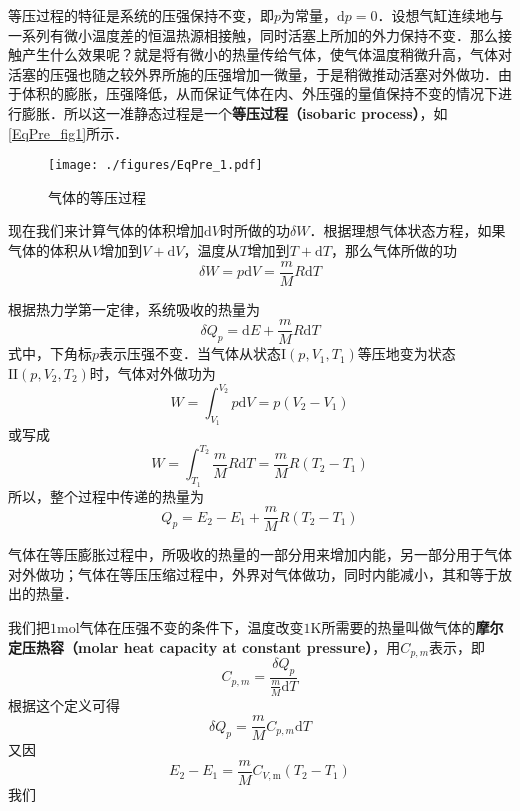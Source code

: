 

等压过程的特征是系统的压强保持不变，即$p $为常量，$\mathrm dp =0$．设想气缸连续地与一系列有微小温度差的恒温热源相接触，同时活塞上所加的外力保持不变．那么接触产生什么效果呢？就是将有微小的热量传给气体，使气体温度稍微升高，气体对活塞的压强也随之较外界所施的压强增加一微量，于是稍微推动活塞对外做功．由于体积的膨胀，压强降低，从而保证气体在内、外压强的量值保持不变的情况下进行膨胀．所以这一准静态过程是一个\textbf{等压过程（isobaric process）}，如\autoref{EqPre_fig1}所示．
\begin{figure}[ht]
\centering
\texttt{[image: ./figures/EqPre\_1.pdf]}
\caption{气体的等压过程} \label{EqPre_fig1}
\end{figure}
现在我们来计算气体的体积增加$\mathrm d V $时所做的功$\delta W$．根据理想气体状态方程，如果气体的体积从$V $增加到$V+\mathrm dV$，温度从$T $增加到$T+\mathrm dT$，那么气体所做的功
\begin{equation}
\delta W=p \mathrm{d} V=\frac{m}{M} R \mathrm{d} T
\end{equation}

根据热力学第一定律，系统吸收的热量为
\begin{equation}
\delta Q_{p}=\mathrm{d} E+\frac{m}{M} R \mathrm{d} T
\end{equation}
式中，下角标$p $表示压强不变．当气体从状态$\mathrm I(p, V_1, T_1)$等压地变为状态$\mathrm{II}(p, V_2,T_2)$时，气体对外做功为
\begin{equation}
W=\int_{V_{1}}^{V_{2}} p \mathrm{d} V=p\left(V_{2}-V_{1}\right)
\end{equation}
或写成
\begin{equation}
W=\int_{T_{1}}^{T_{2}} \frac{m}{M} R \mathrm{d} T=\frac{m}{M} R\left(T_{2}-T_{1}\right)
\end{equation}
所以，整个过程中传递的热量为
\begin{equation}
Q_{p}=E_{2}-E_{1}+\frac{m}{M} R\left(T_{2}-T_{1}\right)
\end{equation}

气体在等压膨胀过程中，所吸收的热量的一部分用来增加内能，另一部分用于气体对外做功；气体在等压压缩过程中，外界对气体做功，同时内能减小，其和等于放出的热量．

我们把$1\mathrm{mol}$气体在压强不变的条件下，温度改变$1\mathrm K$所需要的热量叫做气体的\textbf{摩尔定压热容（molar heat capacity at constant pressure）}，用$C_{p,m}$表示，即
\begin{equation}
C_{p, {m}}=\frac{\delta Q_{p}}{\frac{m}{M} \mathrm{d} T}
\end{equation}
根据这个定义可得
\begin{equation}
\delta Q_{p}=\frac{m}{M} C_{p, {m}} \mathrm{d} T
\end{equation}
又因
\begin{equation}
E_{2}-E_{1}=\frac{m}{M} C_{V, \mathrm{m}}\left(T_{2}-T_{1}\right)
\end{equation}
我们
